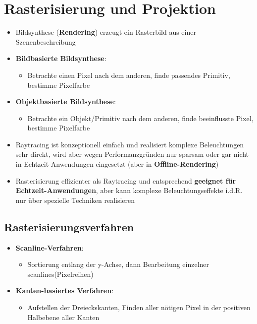 \section{Rasterisierung und Projektion}%
\label{rp:sec:rasterisierung_und_projektion}

\begin{itemize}
	\item Bildsynthese (\textbf{Rendering}) erzeugt ein Rasterbild aus einer Szenenbeschreibung
	\item \textbf{Bildbasierte Bildsynthese}:
	\begin{itemize}
		\item Betrachte einen Pixel nach dem anderen, finde passendes Primitiv, bestimme Pixelfarbe
	\end{itemize}
	\item \textbf{Objektbasierte Bildsynthese}:
	\begin{itemize}
		\item Betrachte ein Objekt/Primitiv nach dem anderen, finde beeinflusste Pixel, bestimme Pixelfarbe
	\end{itemize}
	\item Raytracing ist konzeptionell einfach und realisiert komplexe Beleuchtungen sehr direkt, wird aber wegen Performanzgründen nur sparsam oder gar nicht in Echtzeit-Anwendungen eingesetzt (aber in \textbf{Offline-Rendering})
	\item Rasterisierung effizienter als Raytracing und entsprechend \textbf{geeignet für Echtzeit-Anwendungen}, aber kann komplexe Beleuchtungseffekte i.d.R. nur über spezielle Techniken realisieren
\end{itemize}

\subsection{Rasterisierungsverfahren}%
\label{rp:sub:rasterisierungsverfahren}

\begin{itemize}
	\item \textbf{Scanline-Verfahren}:
	\begin{itemize}
		\item Sortierung entlang der y-Achse, dann Bearbeitung einzelner \glqq scanlines\grqq (Pixelreihen)
	\end{itemize}
	\item \textbf{Kanten-basiertes Verfahren}:
	\begin{itemize}
		\item Aufstellen der Dreieckskanten, Finden aller nötigen Pixel in der positiven Halbebene aller Kanten
	\end{itemize}
\end{itemize}


